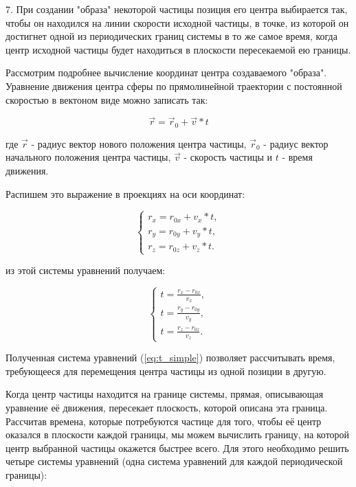 \documentclass{article}
\begin{document}
7. При создании "образа" некоторой частицы позиция его центра выбирается так, чтобы он находился на линии скорости исходной частицы, в точке, из которой он достигнет одной из периодических границ системы в то же самое время, когда центр исходной частицы будет находиться в плоскости пересекаемой ею границы.

Рассмотрим подробнее вычисление координат центра создаваемого "образа". Уравнение движения центра сферы по прямолинейной траектории с постоянной скоростью в вектоном виде можно записать так:

\begin{equation}
\vec{r} = \vec{r}_0 + \vec{v}*t
\end{equation}

где $ \vec{r} $ - радиус вектор нового положения центра частицы, $ \vec{r}_0 $ - радиус вектор начального положения центра частицы, $ \vec{v} $ - скорость частицы и $ t $ - время движения.

Распишем это выражение в проекциях на оси координат:

\begin{equation}\label{eq:r_scalar}
    \begin{cases}
        r_x = r_{0x} + v_x * t,
        \\
        r_y = r_{0y} + v_y * t,
        \\
        r_z = r_{0z} + v_z * t.
    \end{cases}
\end{equation}

из этой системы уравнений получаем:

\begin{equation}\label{eq:t_simple}
    \begin{cases}
        t = \displaystyle\frac{r_x - r_{0x}}{v_x},
        \\
        t = \displaystyle\frac{r_y - r_{0y}}{v_y},
        \\
        t = \displaystyle\frac{r_z - r_{0z}}{v_z}.
    \end{cases}
\end{equation}

Полученная система уравнений (\ref{eq:t_simple}) позволяет рассчитывать время, требующееся для перемещения центра частицы из одной позиции в другую.

Когда центр частицы находится на границе системы, прямая, описывающая уравнение её движения, пересекает плоскость, которой описана эта граница. Рассчитав времена, которые потребуются частице для того, чтобы её центр оказался в плоскости каждой границы, мы можем вычислить границу, на которой центр выбранной частицы окажется быстрее всего. Для этого необходимо решить четыре системы уравнений (одна система уравнений для каждой периодической границы):
\end{document}
